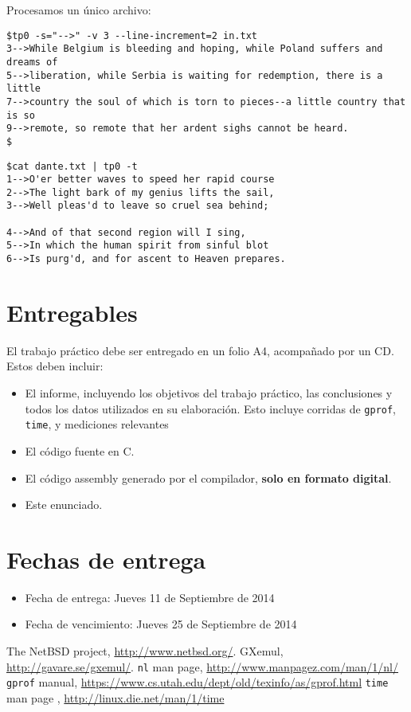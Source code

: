 \documentclass[9pt,a4paper]{article}
\newcommand{\gprof}{\texttt{gprof}}
\newcommand{\nl}{\texttt{nl}}
\newcommand{\unixtime}{\texttt{time}}
\begin{document}
\noindent
Procesamos un único archivo:
\begin{small}
\begin{verbatim}
$tp0 -s="-->" -v 3 --line-increment=2 in.txt
3-->While Belgium is bleeding and hoping, while Poland suffers and dreams of
5-->liberation, while Serbia is waiting for redemption, there is a little
7-->country the soul of which is torn to pieces--a little country that is so
9-->remote, so remote that her ardent sighs cannot be heard.
$
\end{verbatim}
\end{small}

\begin{small}
\begin{verbatim}
$cat dante.txt | tp0 -t
1-->O'er better waves to speed her rapid course
2-->The light bark of my genius lifts the sail,
3-->Well pleas'd to leave so cruel sea behind;

4-->And of that second region will I sing,
5-->In which the human spirit from sinful blot
6-->Is purg'd, and for ascent to Heaven prepares.
\end{verbatim}
\end{small}


\section{Entregables}
El trabajo práctico debe ser entregado en un folio A4, acompañado por un CD. Estos
deben incluir:
\begin{itemize}
\item El informe, incluyendo los objetivos del trabajo práctico, las conclusiones y todos los 
datos utilizados en su elaboración. Esto incluye corridas de \gprof, \unixtime, y mediciones relevantes
\item El código fuente en C.
\item El código assembly generado por el compilador, \textbf{solo en formato digital}.
\item Este enunciado.
\end{itemize}

\section{Fechas de entrega}
\begin{itemize}
\item Fecha de entrega: Jueves 11 de Septiembre de 2014
\item Fecha de vencimiento: Jueves 25 de Septiembre de 2014
\end{itemize}

\begin{thebibliography}{99}
  The NetBSD project, \url{http://www.netbsd.org/}.
  GXemul, \url{http://gavare.se/gxemul/}.
\nl{} man page, \url{http://www.manpagez.com/man/1/nl/}
 \gprof{} manual, \url{https://www.cs.utah.edu/dept/old/texinfo/as/gprof.html}
 \unixtime{} man page  , \url{http://linux.die.net/man/1/time}
\end{thebibliography}
\end{document}

